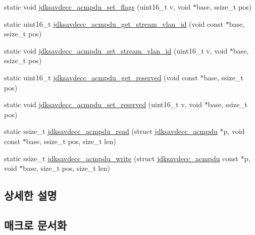\begin{DoxyCompactItemize}
\item 
static void \hyperlink{group__acmpdu_ga49e50aa7a4e0eaa49c0cd1131839a5ee}{jdksavdecc\+\_\+acmpdu\+\_\+set\+\_\+flags} (uint16\+\_\+t v, void $\ast$base, ssize\+\_\+t pos)
\item 
static uint16\+\_\+t \hyperlink{group__acmpdu_gafded2a8f72771f4041c5995e1c57a239}{jdksavdecc\+\_\+acmpdu\+\_\+get\+\_\+stream\+\_\+vlan\+\_\+id} (void const $\ast$base, ssize\+\_\+t pos)
\item 
static void \hyperlink{group__acmpdu_ga137c02c4decd61467d9f15fa56c317eb}{jdksavdecc\+\_\+acmpdu\+\_\+set\+\_\+stream\+\_\+vlan\+\_\+id} (uint16\+\_\+t v, void $\ast$base, ssize\+\_\+t pos)
\item 
static uint16\+\_\+t \hyperlink{group__acmpdu_ga8fcc754986fe4ee46a648dacea59e6b3}{jdksavdecc\+\_\+acmpdu\+\_\+get\+\_\+reserved} (void const $\ast$base, ssize\+\_\+t pos)
\item 
static void \hyperlink{group__acmpdu_ga56fa6ee1a0414569dfc95ef96208f603}{jdksavdecc\+\_\+acmpdu\+\_\+set\+\_\+reserved} (uint16\+\_\+t v, void $\ast$base, ssize\+\_\+t pos)
\item 
static ssize\+\_\+t \hyperlink{group__acmpdu_gaf49dbf727e31865dd891330cbdeeabc2}{jdksavdecc\+\_\+acmpdu\+\_\+read} (struct \hyperlink{structjdksavdecc__acmpdu}{jdksavdecc\+\_\+acmpdu} $\ast$p, void const $\ast$base, ssize\+\_\+t pos, size\+\_\+t len)
\item 
static ssize\+\_\+t \hyperlink{group__acmpdu_ga8cf8b61ba149419878384da1540d9673}{jdksavdecc\+\_\+acmpdu\+\_\+write} (struct \hyperlink{structjdksavdecc__acmpdu}{jdksavdecc\+\_\+acmpdu} const $\ast$p, void $\ast$base, size\+\_\+t pos, size\+\_\+t len)
\end{DoxyCompactItemize}


\subsection{상세한 설명}


\subsection{매크로 문서화}

